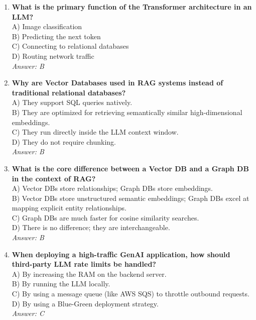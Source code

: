 \documentclass[12pt,a4paper,oneside]{book}
\begin{document}
\begin{enumerate}
    \item \textbf{What is the primary function of the Transformer architecture in an LLM?} \\
    A) Image classification \\
    B) Predicting the next token \\
    C) Connecting to relational databases \\
    D) Routing network traffic \\
    \textit{Answer: B}

    \item \textbf{Why are Vector Databases used in RAG systems instead of traditional relational databases?} \\
    A) They support SQL queries natively. \\
    B) They are optimized for retrieving semantically similar high-dimensional embeddings. \\
    C) They run directly inside the LLM context window. \\
    D) They do not require chunking. \\
    \textit{Answer: B}

    \item \textbf{What is the core difference between a Vector DB and a Graph DB in the context of RAG?} \\
    A) Vector DBs store relationships; Graph DBs store embeddings. \\
    B) Vector DBs store unstructured semantic embeddings; Graph DBs excel at mapping explicit entity relationships. \\
    C) Graph DBs are much faster for cosine similarity searches. \\
    D) There is no difference; they are interchangeable. \\
    \textit{Answer: B}

    \item \textbf{When deploying a high-traffic GenAI application, how should third-party LLM rate limits be handled?} \\
    A) By increasing the RAM on the backend server. \\
    B) By running the LLM locally. \\
    C) By using a message queue (like AWS SQS) to throttle outbound requests. \\
    D) By using a Blue-Green deployment strategy. \\
    \textit{Answer: C}


\end{enumerate}
\end{document}
